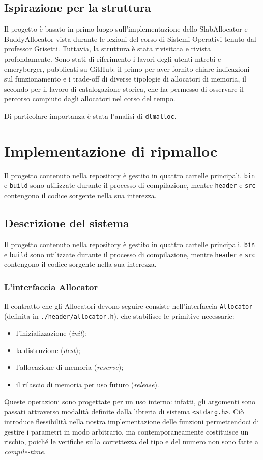 \documentclass[noexaminfo]{sapthesis}
\begin{document}
\section{Ispirazione per la struttura}
Il progetto è basato in primo luogo sull’implementazione dello SlabAllocator e BuddyAllocator vista durante le lezioni del corso di Sistemi Operativi tenuto dal professor Grisetti. Tuttavia, la struttura è stata rivisitata e rivista profondamente. Sono stati di riferimento i lavori degli utenti mtrebi e emeryberger, pubblicati su GitHub: il primo per aver fornito chiare indicazioni sul funzionamento e i trade-off di diverse tipologie di allocatori di memoria, il secondo per il lavoro di catalogazione storica, che ha permesso di osservare il percorso compiuto dagli allocatori nel corso del tempo.

Di particolare importanza è stata l’analisi di \texttt{dlmalloc}.

\chapter{Implementazione di ripmalloc}

Il progetto contenuto nella repository è gestito in quattro cartelle principali. \texttt{bin} e \texttt{build} sono utilizzate durante il processo di compilazione, mentre \texttt{header} e \texttt{src} contengono il codice sorgente nella sua interezza.

\section{Descrizione del sistema}

Il progetto contenuto nella repository è gestito in quattro cartelle principali. \texttt{bin} e \texttt{build} sono utilizzate durante il processo di compilazione, mentre \texttt{header} e \texttt{src} contengono il codice sorgente nella sua interezza.

\subsection{L’interfaccia Allocator}

Il contratto che gli Allocatori devono seguire consiste nell’interfaccia \texttt{Allocator} (definita in \texttt{./header/allocator.h}), che stabilisce le primitive necessarie:
\begin{itemize}
  \item l’inizializzazione (\textit{init});
  \item la distruzione (\textit{dest});
  \item l’allocazione di memoria (\textit{reserve});
  \item il rilascio di memoria per uso futuro (\textit{release}).
\end{itemize}
Queste operazioni sono progettate per un uso interno: infatti, gli argomenti sono passati attraverso modalità definite dalla libreria di sistema \texttt{<stdarg.h>}. Ciò introduce flessibilità nella nostra implementazione delle funzioni permettendoci di gestire i parametri in modo arbitrario, ma contemporaneamente costituisce un rischio, poiché le verifiche sulla correttezza del tipo e del numero non sono fatte a \textit{compile-time}.
\end{document}
